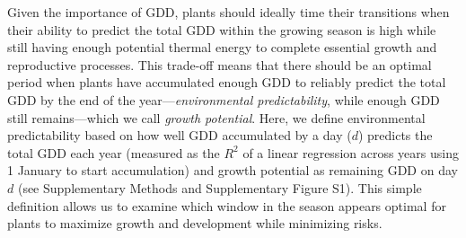 \documentclass[11pt,letter]{article}
\begin{document}
Given the importance of GDD, plants should ideally time their transitions when their ability to predict the total GDD within the growing season is high while still having enough potential thermal energy to complete essential growth and reproductive processes. This trade-off means that there should be an optimal period when plants have accumulated enough GDD
to reliably predict the total GDD by the end of the year---\emph{environmental predictability}, while enough GDD still remains---which we call \emph{growth potential}. Here, we define environmental predictability based on how well GDD accumulated by a day ($d$) predicts the total GDD 
each year (measured as the $R^2$ of a linear regression across years using 1 January to start accumulation) and growth potential as remaining GDD on day $d$ (see Supplementary Methods and Supplementary Figure S1). %
This simple definition allows us to examine which window in the season appears optimal for plants to maximize growth and development while minimizing risks.
\end{document}
